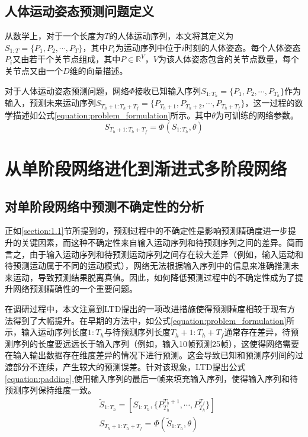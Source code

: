 \subsection{人体运动姿态预测问题定义}
从数学上，对于一个长度为$T$的人体运动序列，本文将其定义为$S_{1:T} = \{P_1,P_2,\cdots,P_{T}\}$，其中$P_i$为运动序列中位于$i$时刻的人体姿态。每个人体姿态$P_i$又由若干个关节点组成，其中$P \in \mathbb{R}^V$，$V$为该人体姿态包含的关节点数量，每个关节点又由一个$D$维的向量描述。

对于人体运动姿态预测问题，网络$\Phi$接收已知输入序列$S_{1:T_h} = \{P_1,P_2,\cdots,P_{T_h}\}$作为输入，预测未来运动序列$S_{T_h+1:T_h+T_f} = \{P_{T_h+1},P_{T_h+2},\cdots,P_{T_h+T_f}\}$，这一过程的数学描述如公式\ref{equation:problem_formulation}所示。其中$\theta$为可训练的网络参数。
\begin{equation}
    S_{T_h+1:T_h+T_f} = \Phi(S_{1:T_h}, \theta) \label{equation:problem_formulation}
\end{equation}

\section{从单阶段网络进化到渐进式多阶段网络}
\subsection{对单阶段网络中预测不确定性的分析}
正如\ref{section:1.1}节所提到的，预测过程中的不确定性是影响预测精确度进一步提升的关键因素，而这种不确定性来自输入运动序列和待预测序列之间的差异。简而言之，由于输入运动序列和待预测运动序列之间存在较大差异（例如，输入运动和待预测运动属于不同的运动模式），网络无法根据输入序列中的信息来准确推测未来运动，导致预测结果脱离真值。因此，如何降低预测过程中的不确定性成为了提升网络预测精确性的一个重要问题。

在调研过程中，本文注意到LTD\parencite{mao2019learning}提出的一项改进措施使得预测精度相较于现有方法得到了大幅提升。在早期的方法中，如公式\ref{equation:problem_formulation}所示，输入运动序列长度$1:T_h$与待预测序列长度$T_h+1:T_h+T_f$通常存在差异，待预测序列的长度要远远长于输入序列（例如，输入10帧预测25帧），这使得网络需要在输入输出数据存在维度差异的情况下进行预测。这会导致已知和预测序列间的过渡部分不连续，产生较大的预测误差。针对该现象，LTD\parencite{mao2019learning}提出公式\ref{equation:padding},使用输入序列的最后一帧来填充输入序列，使得输入序列和待预测序列保持维度一致。
\begin{equation}
    \begin{aligned}
        &\widetilde{S}_{1:T_h} = [S_{1:T_h}, \{P^{T_h+1}_{T_h}, \cdots, P^{T_f}_{T_h} \} ]
        \\
        &S_{T_h+1:T_h+T_f} = \Phi(\widetilde{S}_{1:T_h}, \theta)
    \end{aligned}
    \label{equation:padding}
\end{equation}

